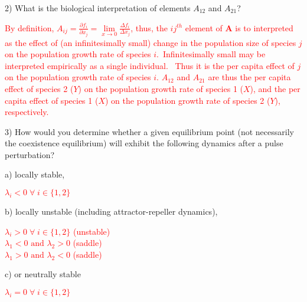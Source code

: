 \documentclass{article}
\begin{document}
\pagebreak

2) What is the biological interpretation of elements $A_{12}$ and $A_{21}$?
\vspace{0.5cm}

\textcolor{red}{
	By definition, $A_{ij} = \frac{\partial f_i}{\partial x_j} = \lim\limits_{x \to 0} \frac{\Delta f_i}{\Delta x_j}$, thus, the $ij^{th}$ element of $\textbf{A}$ is to interpreted as the effect of (an infinitesimally small) change in the population size of species $j$ on the population growth rate of species $i$. Infinitesimally small may be interpreted empirically as a single individual.  Thus it is the per capita effect of $j$ on the population growth rate of species $i$.  $A_{12}$ and $A_{21}$ are thus the per capita effect of species 2 ($Y$) on the population growth rate of species 1 ($X$), and the per capita effect of species 1 ($X$) on the population growth rate of species 2 ($Y$), respectively.
}
\vspace{1 cm}


3) How would you determine whether a given equilibrium point (not necessarily the coexistence equilibrium) will exhibit the following dynamics after a pulse perturbation?
\vspace{0.5cm}




a) locally stable,

\textcolor{red}{
	$\lambda_i < 0 \; \forall  \;  i \in \{1,2\}$
}
\vspace{0.5cm}


b) locally unstable (including attractor-repeller dynamics),

\textcolor{red}{
	$\lambda_i > 0 \; \forall  \;  i \in \{1,2\}$ (unstable) \\
	$\lambda_1 < 0 \text{ and } \lambda_2 > 0$ (saddle) \\
	$\lambda_1 > 0 \text{ and } \lambda_2 < 0$ (saddle)
}
\vspace{0.5cm}


c) or neutrally stable

\textcolor{red}{
	$\lambda_i = 0 \; \forall  \;  i \in \{1,2\}$
}
\vspace{0.5cm}
\end{document}
